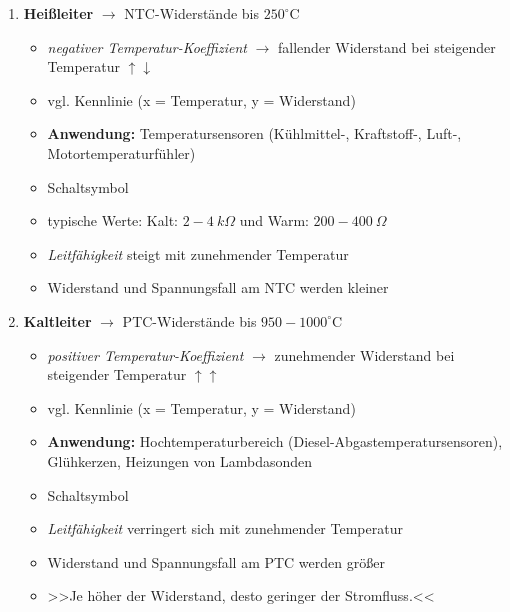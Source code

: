 \begin{enumerate}
\item
  \textbf{Heißleiter} $\to$ NTC-Widerstände bis $250^\circ\text{C}$

  \begin{itemize}
  \item
    \emph{negativer Temperatur-Koeffizient} $\to$ fallender Widerstand
    bei steigender Temperatur $\uparrow \downarrow$
  \item
    vgl. Kennlinie (x = Temperatur, y = Widerstand)
  \item
    \textbf{Anwendung:} Temperatursensoren (Kühlmittel-, Kraftstoff-,
    Luft-, Motortemperaturfühler)
  \item
    Schaltsymbol
  \item
    typische Werte: Kalt: $2 - 4~k\Omega$ und Warm:
    $200 - 400~\Omega$
  \item
    \emph{Leitfähigkeit} steigt mit zunehmender Temperatur
  \item
    Widerstand und Spannungsfall am NTC werden kleiner
  \end{itemize}
\item
  \textbf{Kaltleiter} $\to$ PTC-Widerstände bis
  $950 - 1000^\circ\text{C}$

  \begin{itemize}
  \item
    \emph{positiver Temperatur-Koeffizient} $\to$ zunehmender
    Widerstand bei steigender Temperatur $\uparrow \uparrow$
  \item
    vgl. Kennlinie (x = Temperatur, y = Widerstand)
  \item
    \textbf{Anwendung:} Hochtemperaturbereich
    (Diesel-Abgastemperatursensoren), Glühkerzen, Heizungen von
    Lambdasonden
  \item
    Schaltsymbol
  \item
    \emph{Leitfähigkeit} verringert sich mit zunehmender Temperatur
  \item
    Widerstand und Spannungsfall am PTC werden größer
  \item
    >>Je höher der Widerstand, desto geringer der Stromfluss.<<
  \end{itemize}
\end{enumerate}
